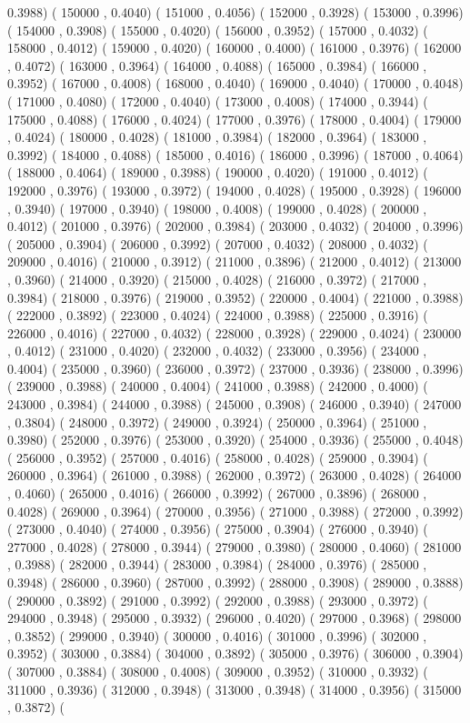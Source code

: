 \documentclass[10pt]{article}
\begin{document}
0.3988)  ( 150000 , 0.4040)  ( 151000 , 0.4056)  ( 152000 , 0.3928)  ( 153000 , 0.3996)  ( 154000 , 0.3908)  ( 155000 , 0.4020)  ( 156000 , 0.3952)  ( 157000 , 0.4032)  ( 158000 , 0.4012)  ( 159000 , 0.4020)  ( 160000 , 0.4000)  ( 161000 , 0.3976)  ( 162000 , 0.4072)  ( 163000 , 0.3964)  ( 164000 , 0.4088)  ( 165000 , 0.3984)  ( 166000 , 0.3952)  ( 167000 , 0.4008)  ( 168000 , 0.4040)  ( 169000 , 0.4040)  ( 170000 , 0.4048)  ( 171000 , 0.4080)  ( 172000 , 0.4040)  ( 173000 , 0.4008)  ( 174000 , 0.3944)  ( 175000 , 0.4088)  ( 176000 , 0.4024)  ( 177000 , 0.3976)  ( 178000 , 0.4004)  ( 179000 , 0.4024)  ( 180000 , 0.4028)  ( 181000 , 0.3984)  ( 182000 , 0.3964)  ( 183000 , 0.3992)  ( 184000 , 0.4088)  ( 185000 , 0.4016)  ( 186000 , 0.3996)  ( 187000 , 0.4064)  ( 188000 , 0.4064)  ( 189000 , 0.3988)  ( 190000 , 0.4020)  ( 191000 , 0.4012)  ( 192000 , 0.3976)  ( 193000 , 0.3972)  ( 194000 , 0.4028)  ( 195000 , 0.3928)  ( 196000 , 0.3940)  ( 197000 , 0.3940)  ( 198000 , 0.4008)  ( 199000 , 0.4028)  ( 200000 , 0.4012)  ( 201000 , 0.3976)  ( 202000 , 0.3984)  ( 203000 , 0.4032)  ( 204000 , 0.3996)  ( 205000 , 0.3904)  ( 206000 , 0.3992)  ( 207000 , 0.4032)  ( 208000 , 0.4032)  ( 209000 , 0.4016)  ( 210000 , 0.3912)  ( 211000 , 0.3896)  ( 212000 , 0.4012)  ( 213000 , 0.3960)  ( 214000 , 0.3920)  ( 215000 , 0.4028)  ( 216000 , 0.3972)  ( 217000 , 0.3984)  ( 218000 , 0.3976)  ( 219000 , 0.3952)  ( 220000 , 0.4004)  ( 221000 , 0.3988)  ( 222000 , 0.3892)  ( 223000 , 0.4024)  ( 224000 , 0.3988)  ( 225000 , 0.3916)  ( 226000 , 0.4016)  ( 227000 , 0.4032)  ( 228000 , 0.3928)  ( 229000 , 0.4024)  ( 230000 , 0.4012)  ( 231000 , 0.4020)  ( 232000 , 0.4032)  ( 233000 , 0.3956)  ( 234000 , 0.4004)  ( 235000 , 0.3960)  ( 236000 , 0.3972)  ( 237000 , 0.3936)  ( 238000 , 0.3996)  ( 239000 , 0.3988)  ( 240000 , 0.4004)  ( 241000 , 0.3988)  ( 242000 , 0.4000)  ( 243000 , 0.3984)  ( 244000 , 0.3988)  ( 245000 , 0.3908)  ( 246000 , 0.3940)  ( 247000 , 0.3804)  ( 248000 , 0.3972)  ( 249000 , 0.3924)  ( 250000 , 0.3964)  ( 251000 , 0.3980)  ( 252000 , 0.3976)  ( 253000 , 0.3920)  ( 254000 , 0.3936)  ( 255000 , 0.4048)  ( 256000 , 0.3952)  ( 257000 , 0.4016)  ( 258000 , 0.4028)  ( 259000 , 0.3904)  ( 260000 , 0.3964)  ( 261000 , 0.3988)  ( 262000 , 0.3972)  ( 263000 , 0.4028)  ( 264000 , 0.4060)  ( 265000 , 0.4016)  ( 266000 , 0.3992)  ( 267000 , 0.3896)  ( 268000 , 0.4028)  ( 269000 , 0.3964)  ( 270000 , 0.3956)  ( 271000 , 0.3988)  ( 272000 , 0.3992)  ( 273000 , 0.4040)  ( 274000 , 0.3956)  ( 275000 , 0.3904)  ( 276000 , 0.3940)  ( 277000 , 0.4028)  ( 278000 , 0.3944)  ( 279000 , 0.3980)  ( 280000 , 0.4060)  ( 281000 , 0.3988)  ( 282000 , 0.3944)  ( 283000 , 0.3984)  ( 284000 , 0.3976)  ( 285000 , 0.3948)  ( 286000 , 0.3960)  ( 287000 , 0.3992)  ( 288000 , 0.3908)  ( 289000 , 0.3888)  ( 290000 , 0.3892)  ( 291000 , 0.3992)  ( 292000 , 0.3988)  ( 293000 , 0.3972)  ( 294000 , 0.3948)  ( 295000 , 0.3932)  ( 296000 , 0.4020)  ( 297000 , 0.3968)  ( 298000 , 0.3852)  ( 299000 , 0.3940)  ( 300000 , 0.4016)  ( 301000 , 0.3996)  ( 302000 , 0.3952)  ( 303000 , 0.3884)  ( 304000 , 0.3892)  ( 305000 , 0.3976)  ( 306000 , 0.3904)  ( 307000 , 0.3884)  ( 308000 , 0.4008)  ( 309000 , 0.3952)  ( 310000 , 0.3932)  ( 311000 , 0.3936)  ( 312000 , 0.3948)  ( 313000 , 0.3948)  ( 314000 , 0.3956)  ( 315000 , 0.3872)  ( 
\end{document}
